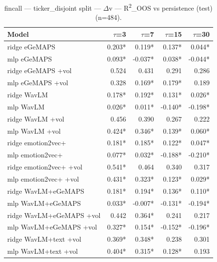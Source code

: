 \begin{table}[t]
\centering
\begin{tabular}{lrrrr}
\toprule
Model & $\tau$=3 & $\tau$=7 & $\tau$=15 & $\tau$=30 \\
\midrule
ridge eGeMAPS & 0.203* & 0.119* & 0.137* & 0.044* \\
mlp eGeMAPS & 0.093* & -0.037* & 0.038* & -0.044* \\
ridge eGeMAPS +vol & 0.524 & 0.431 & 0.291 & 0.286 \\
mlp eGeMAPS +vol & 0.328 & 0.169* & 0.179* & 0.189 \\
ridge WavLM & 0.178* & 0.192* & 0.131* & 0.026* \\
mlp WavLM & 0.026* & 0.011* & -0.140* & -0.198* \\
ridge WavLM +vol & 0.456 & 0.390 & 0.267 & 0.222 \\
mlp WavLM +vol & 0.424* & 0.346* & 0.139* & 0.060* \\
ridge emotion2vec+ & 0.181* & 0.185* & 0.122* & 0.047* \\
mlp emotion2vec+ & 0.077* & 0.032* & -0.188* & -0.210* \\
ridge emotion2vec+ +vol & 0.541* & 0.464 & 0.340 & 0.317 \\
mlp emotion2vec+ +vol & 0.431* & 0.323* & 0.123* & 0.029* \\
ridge WavLM+eGeMAPS & 0.181* & 0.194* & 0.136* & 0.110* \\
mlp WavLM+eGeMAPS & 0.033* & -0.007* & -0.131* & -0.194* \\
ridge WavLM+eGeMAPS +vol & 0.442 & 0.364* & 0.241 & 0.217 \\
mlp WavLM+eGeMAPS +vol & 0.327* & 0.154* & -0.152* & -0.196* \\
ridge WavLM+text +vol & 0.369* & 0.348* & 0.238 & 0.301 \\
mlp WavLM+text +vol & 0.404* & 0.315* & 0.128* & 0.193 \\
\bottomrule
\end{tabular}
\caption{fincall — ticker\_disjoint split — $\Delta$v — R\textsuperscript{2}\_OOS vs persistence (test) (n=484).}
\end{table}

